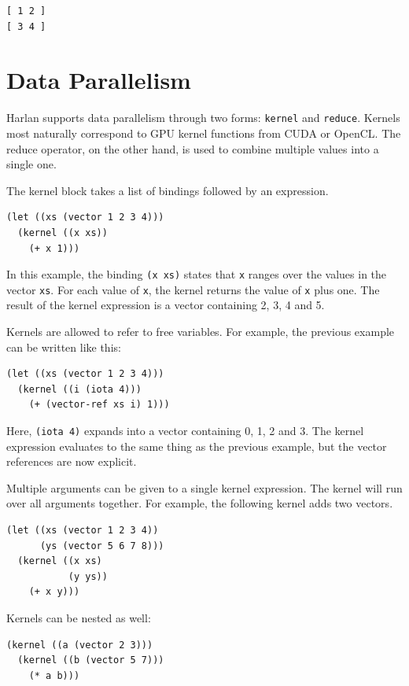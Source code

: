 \documentclass[oneside]{report}
\begin{document}
\begin{verbatim}
[ 1 2 ]
[ 3 4 ]
\end{verbatim}

\section{Data Parallelism}

Harlan supports data parallelism through two forms: \lstinline{kernel}
and \lstinline{reduce}. Kernels most naturally correspond to GPU
kernel functions from CUDA or OpenCL. The reduce operator, on the
other hand, is used to combine multiple values into a single
one. 

The kernel block takes a list of bindings followed by an
expression.

\begin{lstlisting}
(let ((xs (vector 1 2 3 4)))
  (kernel ((x xs))
    (+ x 1)))
\end{lstlisting}

In this example, the binding \lstinline{(x xs)} states that
\lstinline{x} ranges over the values in the vector \lstinline{xs}. For
each value of \lstinline{x}, the kernel returns the value of
\lstinline{x} plus one. The result of the kernel expression is a
vector containing 2, 3, 4 and 5.

Kernels are allowed to refer to free variables. For example, the
previous example can be written like this:

\begin{lstlisting}
(let ((xs (vector 1 2 3 4)))
  (kernel ((i (iota 4)))
    (+ (vector-ref xs i) 1)))
\end{lstlisting}

Here, \lstinline{(iota 4)} expands into a vector containing 0, 1, 2
and 3. The kernel expression evaluates to the same thing as the
previous example, but the vector references are now explicit.

Multiple arguments can be given to a single kernel expression. The
kernel will run over all arguments together. For example, the
following kernel adds two vectors.

\begin{lstlisting}
(let ((xs (vector 1 2 3 4))
      (ys (vector 5 6 7 8)))
  (kernel ((x xs)
           (y ys))
    (+ x y)))
\end{lstlisting}

Kernels can be nested as well:

\begin{lstlisting}
(kernel ((a (vector 2 3)))
  (kernel ((b (vector 5 7)))
    (* a b)))  
\end{lstlisting}
\end{document}
